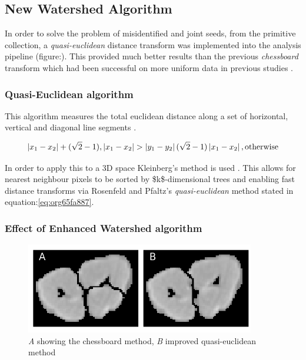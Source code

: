 \documentclass[11pt]{report}
\begin{document}
\subsection{New Watershed Algorithm}
\label{sec:org94b55fb}

In order to solve the problem of misidentified and joint seeds, from the primitive collection,
a  \emph{quasi-euclidean} distance transform was implemented into the analysis pipeline (figure:). This provided much better results than the previous
\emph{chessboard} transform which had been successful on more uniform data in previous studies \cite{Hughes2017}.

\subsubsection{Quasi-Euclidean algorithm}
\label{sec:org10eec79}

This algorithm measures the total euclidean distance along a set of horizontal, vertical and diagonal
line segments \cite{Pfaltz1966}.

\begin{equation}
\label{eq:org65fa887}
\left | x_1 - x_2 \right | + (\sqrt{2}-1), \left | x_1 - x_2 \right | >\left | y_1 - y_2 \right | (\sqrt{2}-1) \left | x_1 - x_2 \right | ,\textup{otherwise}
\end{equation}



In order to apply this to a 3D space Kleinberg's method is used  \cite{Kleinberg1997}. This allows for nearest neighbour pixels to be sorted by \$k\$-dimensional trees
and enabling fast distance transforms via Rosenfeld and Pfaltz's \emph{quasi-euclidean} method stated in equation:\ref{eq:org65fa887}.
\subsubsection{Effect of Enhanced Watershed algorithm}
\label{sec:org3de4344}
\begin{center}
\begin{figure}[htbp]
\centering
\includegraphics[width=10cm]{./images/chess_quasi.png}
\caption{\label{fig:org20c870f}
\emph{A} showing the chessboard method, \emph{B} improved quasi-euclidean method}
\end{figure}
\end{center}
\end{document}
